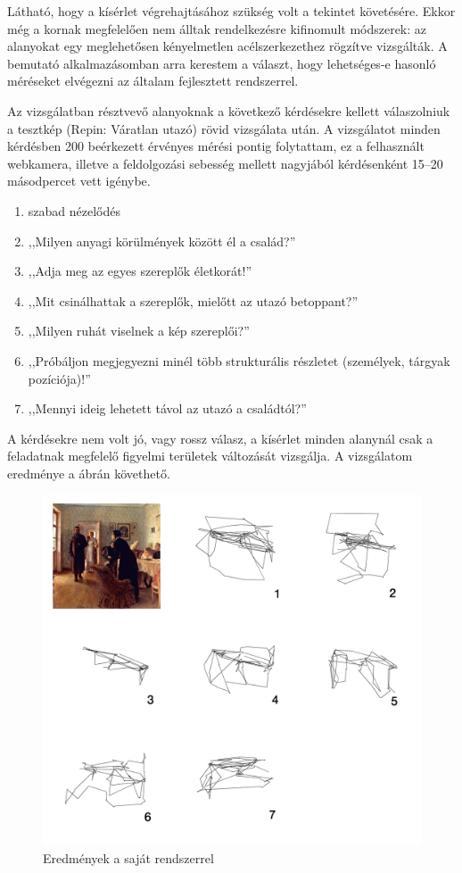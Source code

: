 Látható, hogy a kísérlet végrehajtásához szükség volt a tekintet követésére. Ekkor még a kornak megfelelően nem álltak rendelkezésre kifinomult módszerek: az alanyokat egy meglehetősen kényelmetlen acélszerkezethez rögzítve vizsgálták. A bemutató alkalmazásomban arra kerestem a választ, hogy lehetséges-e hasonló méréseket elvégezni az általam fejlesztett rendszerrel.

\bigskip

Az vizsgálatban résztvevő alanyoknak a következő kérdésekre kellett válaszolniuk a tesztkép (Repin: Váratlan utazó) rövid vizsgálata után. A vizsgálatot minden kérdésben 200 beérkezett érvényes mérési pontig folytattam, ez a felhasznált webkamera, illetve a feldolgozási sebesség mellett nagyjából kérdésenként 15--20 másodpercet vett igénybe.

\begin{enumerate}
 \item szabad nézelődés
 \item ,,Milyen anyagi körülmények között él a család?''
 \item ,,Adja meg az egyes szereplők életkorát!''
 \item ,,Mit csinálhattak a szereplők, mielőtt az utazó betoppant?''
 \item ,,Milyen ruhát viselnek a kép szereplői?''
 \item ,,Próbáljon megjegyezni minél több strukturális részletet (személyek, tárgyak pozíciója)!''
 \item ,,Mennyi ideig lehetett távol az utazó a családtól?''
\end{enumerate}

A kérdésekre nem volt jó, vagy rossz válasz, a kísérlet minden alanynál csak a feladatnak megfelelő figyelmi területek változását vizsgálja. A vizsgálatom eredménye a  ábrán követhető.

\begin{figure}[!ht]
\centering
\includegraphics[width=140mm, keepaspectratio]{figures/yarbus_eredmeny.png}
\caption{Eredmények a saját rendszerrel}
\label{fig:eredmeny}
\end{figure}

